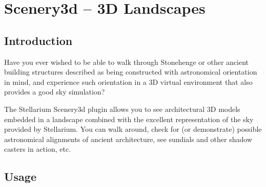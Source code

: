 


\chapter{Scenery3d -- 3D Landscapes}%
\label{ch:scenery3d}

%

\section{Introduction}
\label{sec:scenery3d:Introduction}


Have you ever wished to be able to walk through Stonehenge or other
ancient building structures described as being constructed with
astronomical orientation in mind, and experience such orientation in a
3D virtual environment that also provides a good sky simulation?

The Stellarium Scenery3d plugin allows you to see architectural 3D models
embedded in a landscape combined with the excellent representation of the sky
provided by Stellarium. You can walk around, check for (or
demonstrate) possible astronomical alignments of ancient architecture, see
sundials and other shadow casters in action, etc.

\section{Usage}
\label{sec:scenery3d:Usage}


